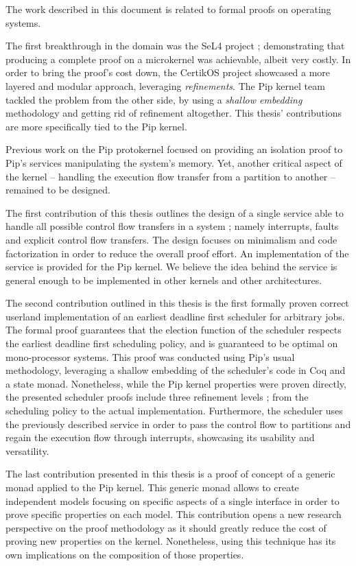 The work described in this document is related to formal proofs on operating systems.

The first breakthrough in the domain was the SeL4 project ; demonstrating that producing a complete proof on a microkernel was achievable, albeit very costly. 
In order to bring the proof's cost down, the CertikOS project showcased a more layered and modular approach, leveraging \emph{refinements}.
The Pip kernel team tackled the problem from the other side, by using a \emph{shallow embedding} methodology and getting rid of refinement altogether. This thesis' contributions are more specifically tied to the Pip kernel.

Previous work on the Pip protokernel focused on providing an isolation proof to Pip's services manipulating the system's memory. Yet, another critical aspect of the kernel -- handling the execution flow transfer from a partition to another -- remained to be designed.

The first contribution of this thesis outlines the design of a single service able to handle all possible control flow transfers in a system ; namely interrupts, faults and explicit control flow transfers. The design focuses on minimalism and code factorization in order to reduce the overall proof effort. An implementation of the service is provided for the Pip kernel. We believe the idea behind the service is general enough to be implemented in other kernels and other architectures.

The second contribution outlined in this thesis is the first formally proven correct userland implementation of an earliest deadline first scheduler for arbitrary jobs. The formal proof guarantees that the election function of the scheduler respects the earliest deadline first scheduling policy, and is guaranteed to be optimal on mono-processor systems. This proof was conducted using Pip's usual methodology, leveraging a shallow embedding of the scheduler's code in Coq and a state monad. Nonetheless, while the Pip kernel properties were proven directly, the presented scheduler proofs include three refinement levels ; from the scheduling policy to the actual implementation. Furthermore, the scheduler uses the previously described service in order to pass the control flow to partitions and regain the execution flow through interrupts, showcasing its usability and versatility.

The last contribution presented in this thesis is a proof of concept of a generic monad applied to the Pip kernel. This generic monad allows to create independent models focusing on specific aspects of a single interface in order to prove specific properties on each model. This contribution opens a new research perspective on the proof methodology as it should greatly reduce the cost of proving new properties on the kernel. Nonetheless, using this technique has its own implications on the composition of those properties.
